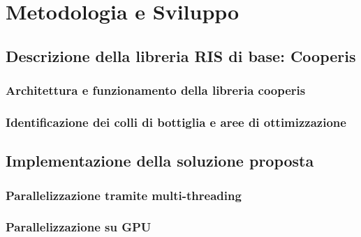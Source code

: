 \chapter{Metodologia e Sviluppo}
\label{ch:metodologiasviluppo}

\section{Descrizione della libreria RIS di base: Cooperis}
\label{sec:libreria}

\lipsum[1]

\subsection{Architettura e funzionamento della libreria cooperis}
\label{sec:architettura}

\lipsum[1]

\subsection{Identificazione dei colli di bottiglia e aree di ottimizzazione}
\label{sec:ottimizzazione}

\lipsum[1]

\section{Implementazione della soluzione proposta}
\label{sec:implementazione}

\lipsum[1]

\subsection{Parallelizzazione tramite multi-threading}
\label{subsec:multithreading}

\lipsum[1]

\subsection{Parallelizzazione su GPU}
\label{subsec:cuda}

\lipsum[1]